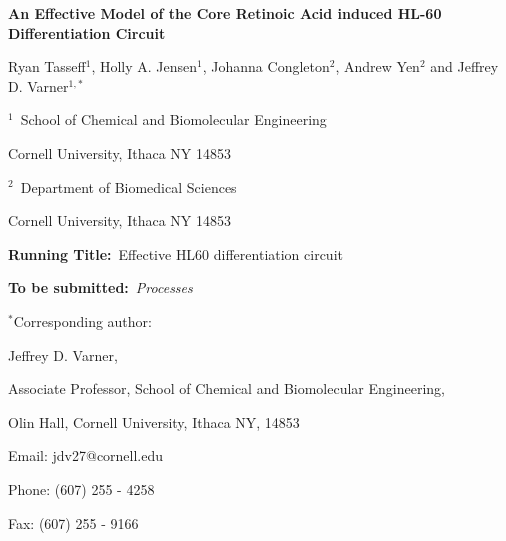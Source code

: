 \documentclass[12pt]{article}
\begin{document}
\begin{titlepage}
{\par\centering\textbf{\Large An Effective Model of the Core Retinoic Acid induced HL-60 Differentiation Circuit}}
\vspace{0.05in}
{\par \centering \large{Ryan Tasseff$^{1}$, 
Holly A. Jensen$^{1}$, 
Johanna Congleton$^{2}$, Andrew Yen$^{2}$ and Jeffrey D. Varner$^{1,*}$}}
\vspace{0.10in}
{\par \centering \large{$^{1}$~School of Chemical and Biomolecular Engineering}}
{\par \centering \large{Cornell University, Ithaca NY 14853}}
\vspace{0.1in}
{\par \centering \large{$^{2}$~Department of Biomedical Sciences}}
{\par \centering \large{Cornell University, Ithaca NY 14853}}
\vspace{0.1in}
{\par \centering \textbf{Running Title:}~Effective HL60 differentiation circuit}
\vspace{0.1in}
{\par \centering \textbf{To be submitted:}~\emph{Processes}}
\vspace{0.5in}
{\par \centering $^{*}$Corresponding author:}
{\par \centering Jeffrey D. Varner,}
{\par \centering Associate Professor, School of Chemical and Biomolecular Engineering,}
{\par {} Olin Hall, Cornell University, Ithaca NY, 14853} 
{\par \centering Email: jdv27@cornell.edu} 
{\par \centering Phone: (607) 255 - 4258}
{\par \centering Fax: (607) 255 - 9166}
\end{titlepage}
\date{}
\thispagestyle{empty}
\pagebreak
\end{document}

